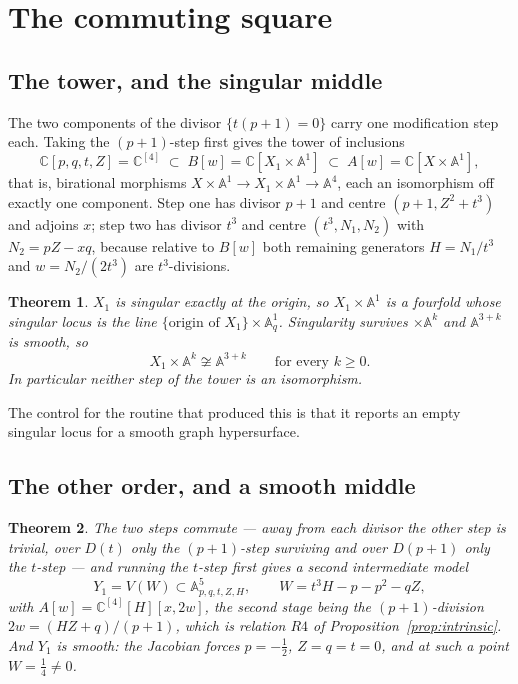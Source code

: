 \documentclass[11pt]{article}
\newtheorem{theorem}{Theorem}[section]
\theoremstyle{definition}
\theoremstyle{remark}
\newcommand{\C}{\mathbb{C}}
\newcommand{\Aff}[1]{\mathbb{A}^{#1}}
\begin{document}
\section{The commuting square}\label{sec:square}

\subsection{The tower, and the singular middle}

The two components of the divisor $\{t(p+1)=0\}$ carry one modification step
each. Taking the $(p+1)$-step first gives the tower of inclusions
\begin{equation}\label{eq:tower}
\C[p,q,t,Z]=\C^{[4]}\;\subset\;B[w]=\C[X_1\times\Aff{1}]\;\subset\;A[w]=
\C[X\times\Aff{1}],
\end{equation}
that is, birational morphisms $X\times\Aff{1}\to X_1\times\Aff{1}\to\Aff{4}$,
each an isomorphism off exactly one component. Step one has divisor $p+1$ and
centre $(p+1,Z^2+t^3)$ and adjoins $x$; step two has divisor $t^3$ and centre
$(t^3,N_1,N_2)$ with $N_2=pZ-xq$, because relative to $B[w]$ both remaining
generators $H=N_1/t^3$ and $w=N_2/(2t^3)$ are $t^3$-divisions.

\begin{theorem}\label{thm:X1kill}
$X_1$ is singular exactly at the origin, so $X_1\times\Aff{1}$ is a fourfold
whose singular locus is the line $\{\text{origin of }X_1\}\times\Aff{1}_q$.
Singularity survives $\times\Aff{k}$ and $\Aff{3+k}$ is smooth, so
\[
X_1\times\Aff{k}\not\cong\Aff{3+k}\qquad\text{for every }k\ge0 .
\]
In particular neither step of the tower is an isomorphism.
\end{theorem}

The control for the routine that produced this is that it reports an empty
singular locus for a smooth graph hypersurface.

\subsection{The other order, and a smooth middle}

\begin{theorem}\label{thm:Y1}
The two steps commute --- away from each divisor the other step is trivial,
over $D(t)$ only the $(p+1)$-step surviving and over $D(p+1)$ only the
$t$-step --- and running the $t$-step first gives a second intermediate model
\begin{equation}\label{eq:Y1}
Y_1 = V(W)\subset\Aff{5}_{p,q,t,Z,H},\qquad W = t^3H-p-p^2-qZ,
\end{equation}
with $A[w]=\C^{[4]}[H][x,2w]$, the second stage being the $(p+1)$-division
$2w=(HZ+q)/(p+1)$, which is relation $R4$ of
Proposition~\ref{prop:intrinsic}. And $Y_1$ is \emph{smooth}: the Jacobian
forces $p=-\tfrac12$, $Z=q=t=0$, and at such a point $W=\tfrac14\ne0$.
\end{theorem}
\end{document}
